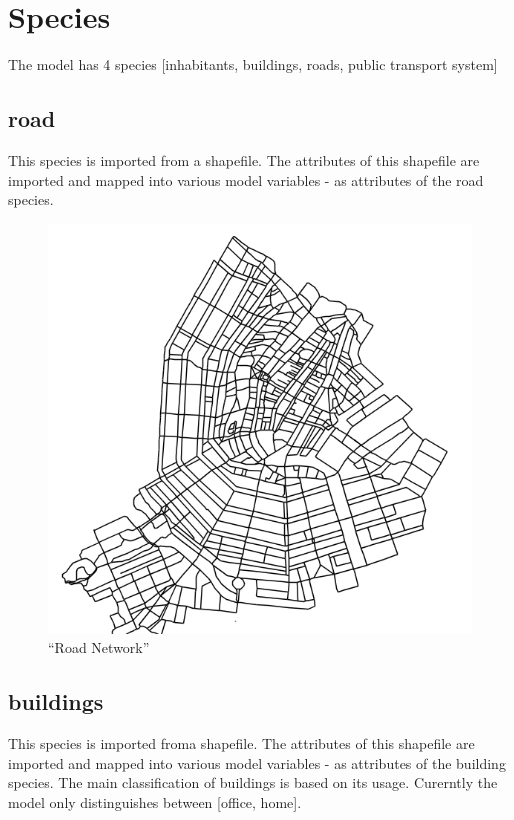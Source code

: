 \documentclass[]{book}
\theoremstyle{definition}
\theoremstyle{definition}
\theoremstyle{definition}
\theoremstyle{remark}
\begin{document}
\hypertarget{species}{%
\chapter{Species}\label{species}}

The model has 4 species {[}inhabitants, buildings, roads, public
transport system{]}

\hypertarget{road}{%
\section{road}\label{road}}

This species is imported from a shapefile. The attributes of this
shapefile are imported and mapped into various model variables - as
attributes of the road species.

\begin{figure}
\centering
\includegraphics{images/network.png}
\caption{``Road Network''}
\end{figure}

\hypertarget{buildings}{%
\section{buildings}\label{buildings}}

This species is imported froma shapefile. The attributes of this
shapefile are imported and mapped into various model variables - as
attributes of the building species. The main classification of buildings
is based on its usage. Curerntly the model only distinguishes between
{[}office, home{]}.
\end{document}

